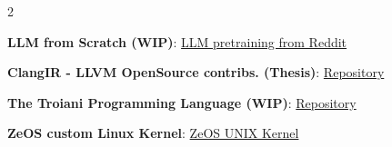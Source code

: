 \documentclass[letterpaper,8pt]{article} %
\begin{document}
\begin{multicols}{2}
\begin{itemize}[leftmargin=0.15in, label={}]
{        \item{\textbf{LLM from Scratch (WIP)}:
            \href{https://github.com/eZWALT/LLM-from-Scratch-Pretrain-and-Pray}{LLM pretraining from Reddit}
        }
        
        \item{\textbf{ClangIR - LLVM OpenSource contribs. (Thesis)}:             
            \href{https://github.com/Llvm/clangir}{Repository}
        }
        \item{\textbf{The Troiani Programming Language (WIP)}: 
            \href{https://github.com/eZWALT/Troiani}{Repository}
        }


        \item{\textbf{ZeOS custom Linux Kernel}: 
            \href{https://github.com/eZWALT/Advanced-Operating-Systems}{ZeOS UNIX Kernel}
        }

        }
 \end{itemize}
\end{multicols}

\end{document}
